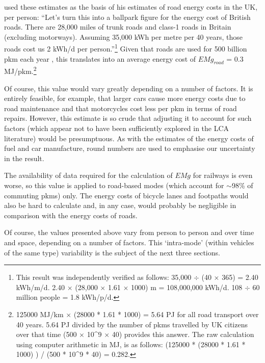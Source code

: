 \documentclass[a4paper, 11pt, twoside]{Thesis}
\begin{document}
\citet[p.~90]{MacKay2009} used these estimates as the basis of his estimates
of road energy costs in the UK, per person: ``Let’s turn this into a ballpark figure
for the energy cost of British roads. There are 28,000 miles of trunk roads
and class-1 roads in Britain (excluding motorways). Assuming 35,000 kWh
per metre per 40 years, those roads cost us 2 kWh/d per
person.''\footnote{This 
result was independently verified as follows:
35,000 $\div$ (40 $\times$ 365) = 2.40 kWh/m/d.
2.40 $\times$ (28,000 $\times$ 1.61 $\times$ 1000) m = 108,000,000 kWh/d.
108 $\div$ 60 million people = 1.8 kWh/p/d.
}
Given that roads are used for 500 billion pkm each year \citep{Mills2011},
this translates into
an average energy cost of $EMg_{road}$ = 0.3
MJ/pkm.\footnote{125000 MJ/km $\times$ (28000 * 1.61 * 1000) = 5.64 PJ for all
road transport over 40 years. 5.64 PJ divided by the number of pkms
travelled by UK citizens over that time (500 $\times$ 10\textasciicircum9 $\times$ 40)
provides this answer. The raw calculation using computer arithmetic in MJ,
is as follows:
(125000 * (28000 * 1.61 * 1000) ) / (500 * 10\textasciicircum9 * 40) = 0.282.
}

Of course, this value would vary greatly depending on a number of factors.
It is entirely feasible, for example, that larger cars cause more energy costs
due to road maintenance and that motorcycles cost less per pkm in terms of
road repairs. However, this estimate is so crude that adjusting it to account
for such factors (which appear not to have been sufficiently explored in the
LCA literature) would be presumptuous. As with the estimates of the
energy costs of fuel and car manufacture, round numbers are used to emphasise
our uncertainty in the result.

The availability of data required for the calculation of
$EMg$ for railways is even worse, so this value is applied to road-based modes
(which account for $\sim$98\% of commuting pkms) only.
The energy costs of bicycle lanes and footpaths would also be hard to
calculate and, in any case, would probably be negligible in comparison
with the energy costs of roads.

Of course, the values presented above vary from person to person and
over time and space, depending on a number of
factors. This `intra-mode' (within vehicles of the
same type) variability is the subject of the next three sections.
\end{document}
